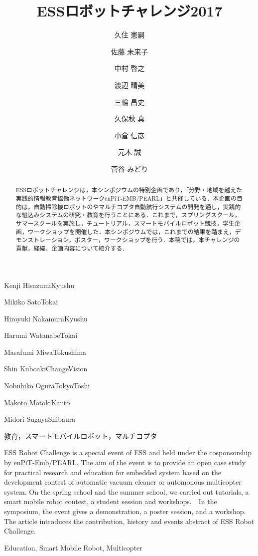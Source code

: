 \documentclass[submit]{ipsj}
\begin{document}
\title{ESSロボットチャレンジ2017}



\author{久住 憲嗣}{Kenji Hisazumi}{Kyushu}
\author{佐藤 未来子}{Mikiko Sato}{Tokai}
\author{中村 啓之}{Hiroyuki Nakamura}{Kyushu}
\author{渡辺 晴美}{Harumi Watanabe}{Tokai}
\author{三輪 昌史}{Masafumi Miwa}{Tokushima}
\author{久保秋 真}{Shin Kuboaki}{ChangeVision}
\author{小倉 信彦}{Nobuhiko Ogura}{TokyoToshi}
\author{元木 誠}{Makoto Motoki}{Kanto}
\author{菅谷 みどり}{Midori Sugaya}{Shibaura}


\begin{abstract}
ESSロボットチャレンジは，本シンポジウムの特別企画であり，「分野・地域を越えた実践的情報教育協働ネットワークenPiT-EMB/PEARL」と共催している．本企画の目的は，自動掃除機ロボットのやマルチコプタ自動航行システムの開発を通し，実践的な組込みシステムの研究・教育を行うことにある．これまで，スプリングスクール，サマースクールを実施し，チュートリアル，スマートモバイルロボット競技，学生企画，ワークショップを開催した．本シンポジウムでは，これまでの結果を踏まえ，デモンストレーション，ポスター，ワークショップを行う．本稿では，本チャレンジの貢献，経緯，企画内容について紹介する．
\end{abstract}

\begin{jkeyword}
教育，スマートモバイルロボット，マルチコプタ
\end{jkeyword}

\begin{eabstract}
ESS Robot Challenge is a special event of ESS and held under the cosponsorship by enPiT-Emb/PEARL. The aim of the event is to provide an open case study for practical research and education for embedded system based on the development contest of automatic vacuum cleaner or automonous multicopter system. On the spring school and the summer school, we carried out tutorials, a smart mobile robot contest, a student session and workshops.　In the symposium, the event gives a demonstration, a poster session, and a workshop. The article introduces the contribution, history and events abstract of ESS Robot Challenge.
\end{eabstract}

\begin{ekeyword}
Education, Smart Mobile Robot, Multicopter
\end{ekeyword}
\end{document}
